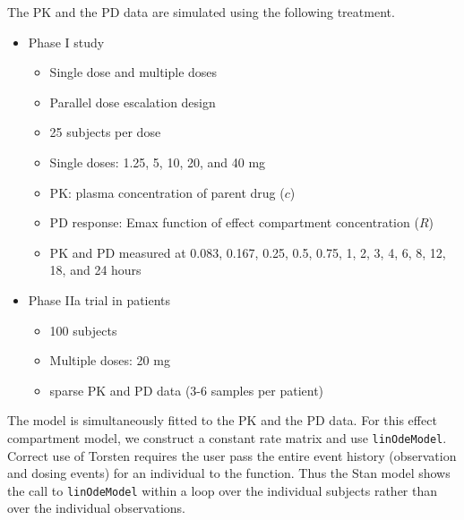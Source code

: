 \documentclass[11pt]{amsart}
\begin{document}
The PK and the PD data are simulated using the following treatment.
\begin{itemize}
  \item Phase I study
  \begin{itemize}
    \item Single dose and multiple doses
    \item Parallel dose escalation design
    \item 25 subjects per dose
    \item Single doses: 1.25, 5, 10, 20, and 40 mg 
    \item PK: plasma concentration of parent drug ($c$)
    \item PD response: Emax function of effect compartment concentration ($R$)
    \item PK and PD measured at 0.083, 0.167, 0.25, 0.5, 0.75, 1, 2, 3, 4, 6, 8, 12, 18, and 24 hours
  \end{itemize}
  \item Phase IIa trial in patients
  \begin{itemize}
    \item 100 subjects
    \item Multiple doses: 20 mg
    \item sparse PK and PD data (3-6 samples per patient)
  \end{itemize}
\end{itemize}

The model is simultaneously fitted to the PK and the PD data. For this effect compartment model, we construct a constant rate matrix and use \texttt{linOdeModel}. Correct use of Torsten requires the user pass the entire event history (observation and dosing events) for an individual to the function. Thus the Stan model shows the call to \texttt{linOdeModel} within a loop over the individual subjects rather than over the individual observations.
\end{document}
